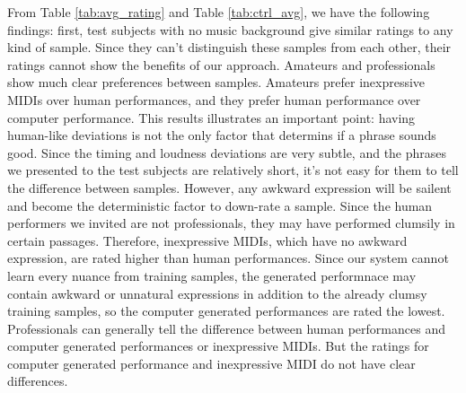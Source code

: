 From Table \ref{tab:avg_rating} and Table \ref{tab:ctrl_avg}, we have the following findings: first, test subjects with no music background give similar ratings to any kind of sample. Since they can't distinguish these samples from each other, their ratings cannot show the benefits of our approach. Amateurs and professionals show much clear preferences between samples. Amateurs prefer inexpressive MIDIs over human performances, and they prefer human performance over computer performance. This results illustrates an important point: having human-like deviations is not the only factor that determins if a phrase sounds good. Since the timing and loudness deviations are very subtle, and the phrases we presented to the test subjects are relatively short, it's not easy for them to tell the difference between samples. However, any awkward expression will be sailent and become the deterministic factor to down-rate a sample. Since the human performers we invited are not professionals, they may have performed clumsily in certain passages. Therefore, inexpressive MIDIs, which have no awkward expression, are rated higher than human performances. Since our system cannot learn every nuance from training samples, the generated performnace may contain awkward or unnatural expressions in addition to the already clumsy training samples, so the computer generated performances are rated the lowest. Professionals can generally tell the difference between human performances and computer generated performances or inexpressive MIDIs. But the ratings for computer generated performance and inexpressive MIDI do not have clear differences.




